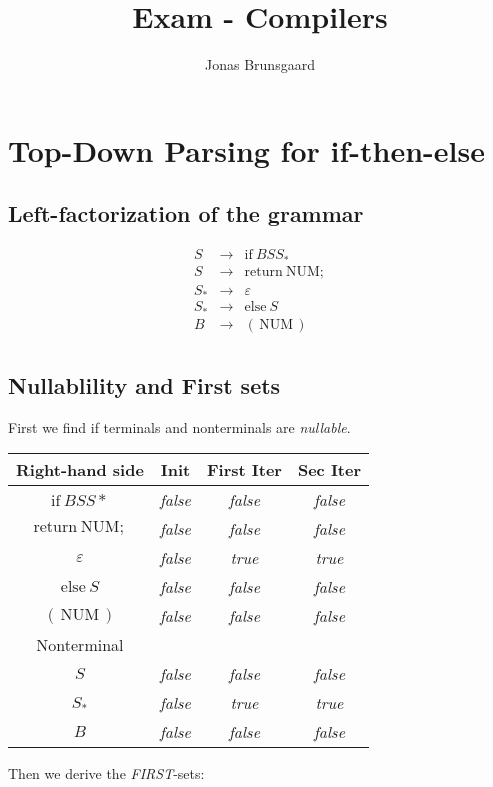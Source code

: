 \documentclass[11pt,a4paper]{article}
\title{Exam - Compilers}
\author{Jonas Brunsgaard}
\begin{document}
\maketitle

\section{Top-Down Parsing for if-then-else}
\subsection{Left-factorization of the grammar}
$$
\begin{array}{lcl}
    S & \rightarrow & \mathrm{if\:}BSS_* \\
    S & \rightarrow & \mathrm{return\:NUM;} \\
    S_* & \rightarrow & \varepsilon \\
    S_* & \rightarrow & \mathrm{else}\:S \\
    B & \rightarrow & \mathrm{(\,NUM\,)} \\
\end{array}
$$
\subsection{Nullablility and First sets}

First we find if terminals and nonterminals are \emph{nullable}.

\begin{center}
\begin{tabular}{c||c|c|c}
Right-hand side & Init & First Iter & Sec Iter\tabularnewline
\hline 
\hline 
$\mathrm{if\:}BSS*$ & \emph{false} & \emph{false} & \emph{false}\tabularnewline
\hline 
$\mathrm{return\:NUM;}$ & \emph{false} & \emph{false} & \emph{false}\tabularnewline
\hline 
$\varepsilon$ & \emph{false} & \emph{true} & \emph{true}\tabularnewline
\hline 
$\mathrm{else}\:S$ & \emph{false} & \emph{false} & \emph{false}\tabularnewline
\hline 
$\mathrm{(\,NUM\,)}$ & \emph{false} & \emph{false} & \emph{false}\tabularnewline
\hline 
Nonterminal & \multicolumn{1}{c}{} & \multicolumn{1}{c}{} & \tabularnewline
\hline 
$S$ & \emph{false} & \emph{false} & \emph{false}\tabularnewline
\hline 
$S_*$ & \emph{false} & \emph{true} & \emph{true}\tabularnewline
\hline 
$B$ & \emph{false} & \emph{false} & \emph{false}\tabularnewline
\end{tabular}
\end{center}

Then we derive the \emph{FIRST}-sets:
\end{document}
